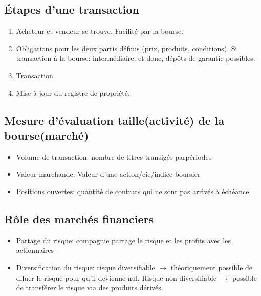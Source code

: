 \documentclass[]{book}
\providecommand{\tightlist}{%
  \setlength{\itemsep}{0pt}\setlength{\parskip}{0pt}}
\theoremstyle{definition}
\theoremstyle{definition}
\theoremstyle{definition}
\theoremstyle{remark}
\begin{document}
\subsection*{Étapes d'une transaction}\label{etapes-dune-transaction}

\begin{enumerate}
\def\labelenumi{\arabic{enumi}.}
\tightlist
\item
  Acheteur et vendeur se trouve. Facilité par la bourse.
\item
  Obligations pour les deux partis définis (prix, produits, conditions).
  Si transaction à la bourse: intermédiaire, et donc, dépôts de garantie
  possibles.
\item
  Transaction
\item
  Mise à jour du registre de propriété.
\end{enumerate}

\subsection*{Mesure d'évaluation taille(activité) de la
bourse(marché)}\label{mesure-devaluation-tailleactivite-de-la-boursemarche}

\begin{itemize}
\tightlist
\item
  Volume de transaction: nombre de titres transigés parpériodes
\item
  Valeur marchande: Valeur d'une action/cie/indice boursier
\item
  Positions ouvertes: quantité de contrats qui ne sont pas arrivés à
  échéance
\end{itemize}

\subsection*{Rôle des marchés
financiers}\label{role-des-marches-financiers}

\begin{itemize}
\tightlist
\item
  Partage du risque: compagnie partage le risque et les profits avec les
  actionnaires
\item
  Diversification du risque: risque diversifiable \(\rightarrow\)
  théoriquement possible de diluer le risque pour qu'il devienne nul.
  Risque non-diversifiable \(\rightarrow\) possible de transférer le
  risque via des produits dérivés.
\end{itemize}
\end{document}
